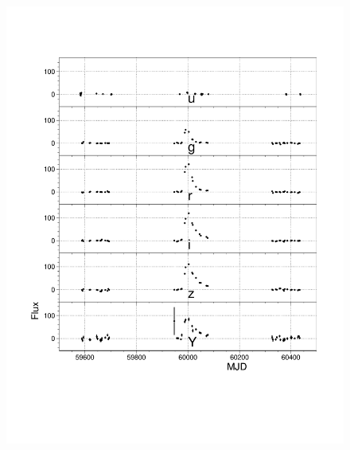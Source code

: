 \documentclass[\docopts]{\docclass}
\begin{document}
\begin{figure}[htbp!]
\begin{center} 
\includegraphics[scale=0.4, trim = 15mm 45mm 10mm 20mm, clip]{figures/lcplot_model01a.pdf}

\end{center}
\end{figure}
\end{document}
